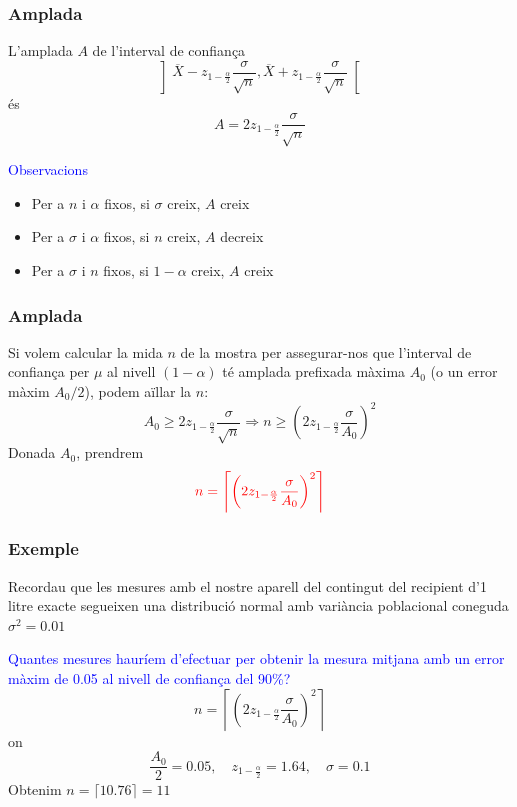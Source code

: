\documentclass[12pt,t]{beamer}
\newcommand{\red}[1]{\textcolor{red}{#1}}
\newcommand{\blue}[1]{\textcolor{blue}{#1}}
\renewcommand{\emph}[1]{{\color{red}#1}}
\renewcommand{\geq}{\geqslant}
\theoremstyle{plain}
\theoremstyle{definition}
\begin{document}
\begin{frame}
\frametitle{Amplada}

L'\emph{amplada} $A$ de l'interval de confiança 
$$
\left]\overline{X} -z_{1-\frac{\alpha}{2}} \frac{\sigma}{\sqrt{n}}, \overline{X}+z_{1-\frac{\alpha}{2}}\frac{\sigma}{\sqrt{n}}
\right[
$$
és
$$
A= 2z_{1-\frac{\alpha}{2}}\frac{\sigma}{\sqrt{n}}
$$

\blue{Observacions}
\begin{itemize}
\item Per a $n$ i $\alpha$ fixos, si $\sigma$ creix,
 $A$ creix
\smallskip

\item Per a $\sigma$ i $\alpha$ fixos, si $n$
creix,  $A$ decreix
\smallskip

\item Per a $\sigma$ i $n$ fixos, si
$1-\alpha$ creix, $A$ creix
\end{itemize}
\end{frame}




\begin{frame}
\frametitle{Amplada}

Si volem calcular la mida $n$ de la mostra per assegurar-nos que l'interval
de confiança per $\mu$ al nivell $(1-\alpha)$ té amplada prefixada màxima $A_0$ (o un
error màxim $A_0/2$), podem aïllar la $n$:
$$
A_0\geq 2z_{1-\frac{\alpha}{2}}\frac{\sigma}{\sqrt{n}}\Rightarrow
n\geq \left( 2 z_{1-\frac{\alpha}{2}}\frac{\sigma}{A_0}
\right)^2
$$
Donada $A_0$, prendrem
$$
\red{n=\left\lceil \left( 2 z_{1-\frac{\alpha}{2}}\frac{\sigma}{A_0}
\right)^2\right\rceil}
$$

\end{frame}


\begin{frame}
\frametitle{Exemple}

Recordau que les mesures amb el nostre aparell del contingut del recipient  d'1 litre exacte
segueixen una distribució normal amb variància poblacional coneguda $\sigma^2=0.01$
\medskip

\blue{Quantes mesures hauríem d'efectuar per obtenir la mesura mitjana amb un error màxim de 0.05 al nivell de confiança del 90\%?}
\pause
$$
n=\left\lceil \left( 2 z_{1-\frac{\alpha}{2}}\frac{\sigma}{A_0}
\right)^2\right\rceil$$
on 
$$
\frac{A_0}{2}=0.05,\quad z_{1-\frac{\alpha}{2}}=1.64,\quad \sigma=0.1
$$
Obtenim $n= \lceil10.76\rceil= 11$




\end{frame}
\end{document}
